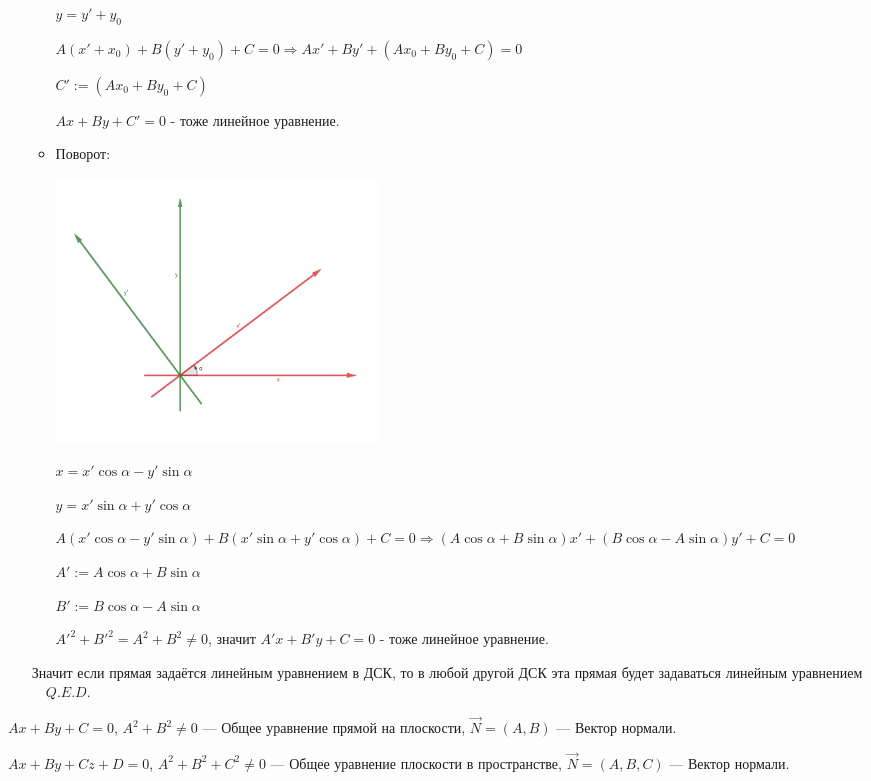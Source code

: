 \documentclass[twoside]{book}
\begin{document}
\begin{enumerate}
\begin{itemize}
                    \(y = y' + y_0\)

                    \(A(x' + x_0) + B(y' + y_0) + C = 0 \Rightarrow Ax' + By' + (Ax_0 + By_0 + C) = 0\)

                    \(C' := (Ax_0 + By_0 + C)\)

                    \(Ax + By + C' = 0\) - тоже линейное уравнение.
              \item Поворот:
                    \begin{center}
                        \includegraphics[height=7cm]{Images/Chapter_1/2-1-4.png}
                    \end{center}
                    \(x = x'\cos\alpha - y'\sin\alpha\)

                    \(y = x'\sin\alpha + y'\cos\alpha\)

                    \(A(x'\cos\alpha - y'\sin\alpha) + B(x'\sin\alpha + y'\cos\alpha) + C = 0 \Rightarrow (A\cos\alpha + B\sin\alpha)x' + (B\cos\alpha - A\sin\alpha)y' + C = 0\)

                    \(A' := A\cos\alpha + B\sin\alpha\)

                    \(B' := B\cos\alpha - A\sin\alpha\)

                    \(A'^2 + B'^2 = A^2 + B^2 \neq 0\), значит \(A'x + B'y + C = 0\) - тоже линейное уравнение.
          \end{itemize}
          Значит если прямая задаётся линейным уравнением в ДСК, то в любой другой ДСК эта прямая будет задаваться линейным уравнением \(\quad Q.E.D.\)
\end{enumerate}

\(Ax + By + C = 0\), \(A^2 + B^2 \neq 0\) --- Общее уравнение прямой на плоскости, \(\vec N = (A, B)\) --- Вектор нормали.

\(Ax + By + Cz + D = 0\), \(A^2 + B^2 + C^2\neq 0\) --- Общее уравнение плоскости в пространстве, \(\vec N = (A, B, C)\) --- Вектор нормали.
\end{document}
